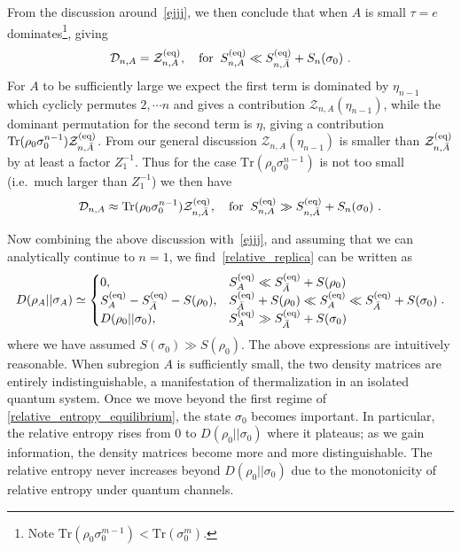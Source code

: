 \documentclass[a4paper,11pt]{article}
\newcommand{\be}{\begin{equation}}
\newcommand{\ee}{\end{equation}}
\newcommand\sig{\sigma}
\newcommand\sD{{\ensuremath{{\mathcal D}}}}
\newcommand\sZ{{\mathcal Z}}
\newcommand{\Tr}{\text{Tr}}
\begin{document}
From the discussion around~\eqref{ejjj}, we then conclude that when $A$ is small $\tau =e$ dominates\footnote{Note $\Tr (\rho_0 \sig_0^{m-1}) < \Tr (\sig_0^m)$.}, giving
\be 
\sD_{n,A} = \mathcal{Z}_{n, A}^{({\rm eq})}, \quad \text{for} \; \;
 S_{n, A}^{(\rm eq)} \ll S_{n, \bar A}^{(\rm eq)} + S_n (\sig_0) \ .
\ee
For $A$ to be sufficiently large we expect the first term is dominated by $\eta_{n-1}$ which cyclicly permutes $2, \cdots n$ 
and gives a contribution $ \sZ_{n, A} (\eta_{n-1})$, while the dominant permutation for the second term is $\eta$, giving a contribution 
$ \Tr (\rho_0 \sig_0^{n-1}) \mathcal{Z}_{n, \bar A}^{({\rm eq})}$. From our general discussion $ \sZ_{n, A} (\eta_{n-1})$ is smaller than $\mathcal{Z}_{n, \bar A}^{({\rm eq})}$ by at least a factor $Z_1^{-1}$. Thus for the case $\Tr (\rho_0 \sig_0^{n-1}) $ is not too small (i.e.~much larger than $Z_1^{-1}$) we then have 
\be 
\sD_{n,A} %
\approx 
 \Tr (\rho_0 \sig_0^{n-1}) \mathcal{Z}_{n, \bar A}^{({\rm eq})}
, \quad \text{for} \; \;
 S_{n, A}^{(\rm eq)} \gg S_{n, \bar A}^{(\rm eq)} + S_n (\sig_0) \ .
\ee

Now combining the above discussion with~\eqref{ejjj}, and assuming that we can analytically continue to $n=1$, we find~\eqref{relative_replica} can be written as 
\begin{align}
 D(\rho_A \lvert \rvert \sigma_A) \simeq \begin{cases}
 0 ,& S_{{A}}^{\rm (eq)} \ll S_{\bar{A}}^{\rm (eq)} + S(\rho_0) 
 \\
 S_{A}^{\rm (eq)} - S_{\bar{A}}^{\rm (eq)}-S(\rho_0), & S_{\bar{A}}^{\rm (eq)} + S(\rho_0) \ll S_{{A}}^{\rm (eq)} \ll S_{\bar{A}}^{\rm (eq)} + S(\sig_0) 
 \\
 D(\rho_0 \lvert \rvert \sigma_0), & S_{{A}}^{\rm (eq)}\gg S_{\bar{A}}^{\rm (eq)} + S(\sig_0) %
 \end{cases}.
 \label{relative_entropy_equilibrium}
\end{align}
where we have assumed $S(\sig_0) \gg S(\rho_0)$. The above expressions are intuitively reasonable. 
When subregion $A$ is sufficiently small, the two density matrices are entirely indistinguishable, a manifestation of thermalization in an isolated quantum system. 
Once we move beyond the first regime of \eqref{relative_entropy_equilibrium}, the state $\sigma_0$ becomes important. In particular, the relative entropy rises from $0$ to $D(\rho_0 || \sigma_0)$ where it plateaus; as we gain information, the density matrices become more and more distinguishable. The relative entropy never increases beyond $D(\rho_0 || \sigma_0)$ due to the monotonicity of relative entropy under quantum channels.
\end{document}
